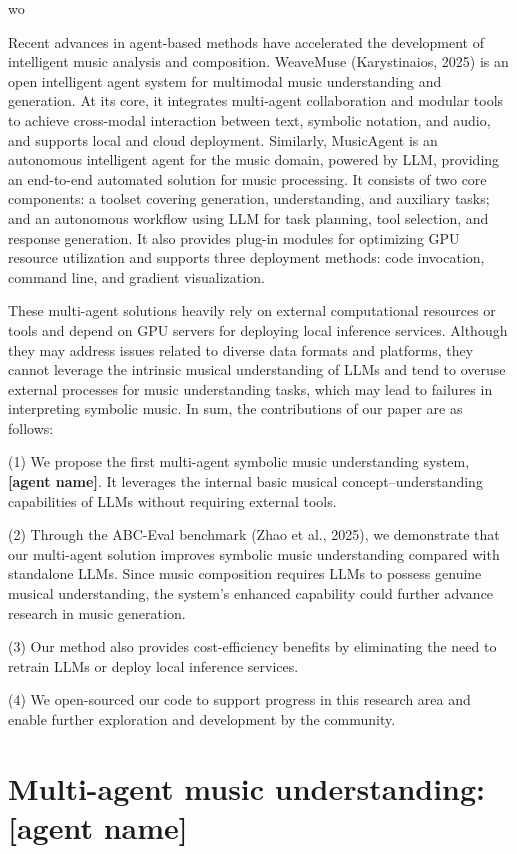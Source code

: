 wo\documentclass[sigconf]{acmart}
\begin{document}
Recent advances in agent-based methods have accelerated the development of intelligent music analysis and composition. WeaveMuse \citep{karystinaiosWeaveMuseOpenAgentic2025}(Karystinaios, 2025) is an open intelligent agent system for multimodal music understanding and generation. At its core, it integrates multi-agent collaboration and modular tools to achieve cross-modal interaction between text, symbolic notation, and audio, and supports local and cloud deployment. Similarly, MusicAgent \citep{yuMusicAgentAIAgent2023} is an autonomous intelligent agent for the music domain, powered by LLM, providing an end-to-end automated solution for music processing. It consists of two core components: a toolset covering generation, understanding, and auxiliary tasks; and an autonomous workflow using LLM for task planning, tool selection, and response generation. It also provides plug-in modules for optimizing GPU resource utilization and supports three deployment methods: code invocation, command line, and gradient visualization.

These multi-agent solutions heavily rely on external computational resources or tools and depend on GPU servers for deploying local inference services. Although they may address issues related to diverse data formats and platforms, they cannot leverage the intrinsic musical understanding of LLMs and tend to overuse external processes for music understanding tasks, which may lead to failures in interpreting symbolic music. In sum, the contributions of our paper are as follows:

(1) We propose the first multi-agent symbolic music understanding system, \textbf{[agent name]}. It leverages the internal basic musical concept–understanding capabilities of LLMs without requiring external tools.

(2) Through the ABC-Eval benchmark (Zhao et al., 2025), we demonstrate that our multi-agent solution improves symbolic music understanding compared with standalone LLMs. Since music composition requires LLMs to possess genuine musical understanding, the system’s enhanced capability could further advance research in music generation.

(3) Our method also provides cost-efficiency benefits by eliminating the need to retrain LLMs or deploy local inference services.

(4) We open-sourced our code to support progress in this research area and enable further exploration and development by the community.


\section{Multi-agent music understanding: [agent name]}
\end{document}
